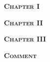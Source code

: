 



\clearpage

\Large 
\begin{center}
\Huge \textsc{\bfseries Chapter I}
\end{center}

\clearpage

\begin{center}
\Huge \textsc{\bfseries Chapter II}
\end{center}

\clearpage

\begin{center}
\Huge \textsc{\bfseries Chapter III}
\end{center}

\clearpage

\begin{center}
\Huge \textsc{\bfseries Comment}
\end{center}

